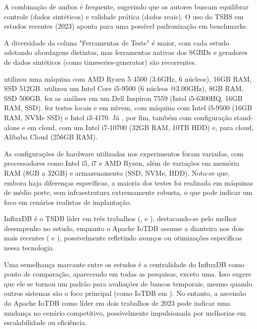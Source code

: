 A combinação de ambos é frequente, sugerindo que os autores buscam equilibrar controle (dados sintéticos) e validade prática (dados reais). O uso do TSBS em estudos recentes (2023) aponta para uma possível padronização em benchmarks.

A diversidade da coluna "Ferramentas de Teste" é maior, com cada estudo adotando abordagens distintas, mas ferramentas nativas dos SGBDs e geradores de dados sintéticos (como timeseries-generator) são recorrentes.

 utilizou uma máquina com AMD Ryzen 5 4500 (3.6GHz, 6 núcleos), 16GB RAM, SSD 512GB.  utilizou um Intel Core i5-9500 (6 núcleos @3.00GHz), 8GB RAM, SSD 500GB.  fez as análises em um Dell Inspiron 7559 (Intel i5-6300HQ, 16GB RAM, SSD).  fez testes locais e em núvem, com máquina com Intel i5-9500 (16GB RAM, NVMe SSD) e Intel i3-4170. Já , por fim, também com configuração stand-alone e em cloud, com um Intel i7-10700 (32GB RAM, 10TB HDD) e, para cloud, Alibaba Cloud (256GB RAM).

As configurações de hardware utilizadas nos experimentos foram variadas, com processadores como Intel i5, i7 e AMD Ryzen, além de variações em memória RAM (8GB a 32GB) e armazenamento (SSD, NVMe, HDD). Nota-se que, embora haja diferenças específicas, a maioria dos testes foi realizada em máquinas de médio porte, sem infraestrutura extremamente robusta, o que pode indicar um foco em cenários realistas de implantação.

InfluxDB é o TSDB líder em três trabalhos (,  e ), destacando-se pelo melhor desempenho no estudo, enquanto o Apache IoTDB assume a dianteira nos dois mais recentes ( e ), possivelmente refletindo avanços ou otimizações específicas nessa tecnologia.

Uma semelhança marcante entre os estudos é a centralidade do InfluxDB como ponto de comparação, aparecendo em todas as pesquisas, exceto uma. Isso sugere que ele se tornou um padrão para avaliações de bancos temporais, mesmo quando outros sistemas são o foco principal (como IoTDB em ). No entanto, a ascensão do Apache IoTDB como líder em dois trabalhos de 2023 pode indicar uma mudança no cenário competitivo, possivelmente impulsionada por melhorias em escalabilidade ou eficiência.

